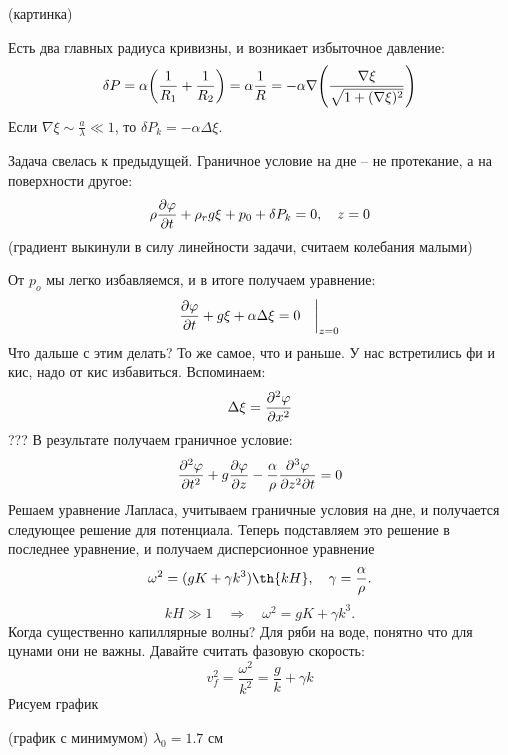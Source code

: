 (картинка)

Есть два главных радиуса кривизны, и возникает избыточное давление:
\begin{equation}
    \delta P = \alpha\qty(\frac{1}{R_1}+\frac{1}{R_2}) = \alpha \frac{1}{R} = -\alpha\nabla \qty(\frac{\nabla\xi}{\sqrt{1+(\nabla\xi)^2}})
\end{equation}
Если $\nabla\xi \sim \frac{a}{\lambda} \ll 1$, то $\delta P_k = -\alpha \Delta \xi$.

Задача свелась к предыдущей. Граничное условие на дне -- не протекание, а на поверхности другое:
\begin{equation}
    \rho\pdv{\varphi}{t}+\rho_r g\xi+p_0+\delta P_k = 0, \quad z = 0
\end{equation}
(градиент выкинули в силу линейности задачи, считаем колебания малыми)

От $p_o$ мы легко избавляемся, и в итоге получаем уравнение:
\begin{equation}
    \pdv{\varphi}{t}+g\xi+\alpha\Delta\xi = 0 \quad\bigg|_{z = 0}
\end{equation}
Что дальше с этим делать? То же самое, что и раньше. У нас встретились фи и кис, надо от кис избавиться. Вспоминаем:
\begin{equation}
    \Delta\xi = \pdv[2]{\varphi}{x}
\end{equation}
??? 
В результате получаем граничное условие:
\begin{equation}
    \pdv[2]{\varphi}{t}+g\pdv{\varphi}{z}-\frac{\alpha}{\rho}\frac{\partial^3\varphi}{\partial z^2 \partial t} = 0
\end{equation}
Решаем уравнение Лапласа, учитываем граничные условия на дне, и получается следующее решение для потенциала. Теперь подставляем это решение в последнее уравнение, и получаем дисперсионное уравнение
\begin{equation}
    \omega^2 = (gK+\gamma k^3)\th{kH}, \quad \gamma = \frac{\alpha}{\rho}.
\end{equation}
\begin{equation}
    kH \gg 1 \quad \Rightarrow \quad \omega^2 = gK+\gamma k^3.
\end{equation}
Когда существенно капиллярные волны? Для ряби на воде, понятно что для цунами они не важны. Давайте считать фазовую скорость:
\begin{equation}
    v_f^2 = \frac{\omega^2}{k^2} = \frac{g}{k}+\gamma k 
\end{equation}
Рисуем график

(график с минимумом) $\lambda_0 = 1.7 \text{ см}$

